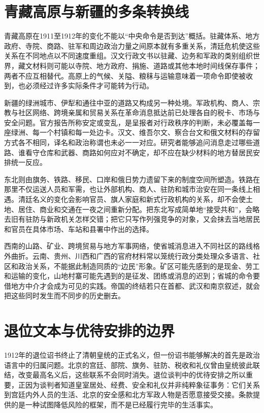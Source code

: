 \section{青藏高原与新疆的多条转换线}

青藏高原在1911至1912年的变化不能以“中央命令是否到达”概括。驻藏体系、地方政府、寺院、商路、驻军和周边政治力量之间原本就有多重关系，清廷危机使这些关系在不同地点以不同速度重组。汉文行政文书以驻藏、边务和军政的类别组织世界，藏文材料则可能以寺院、地方政府、捐施、道路或其他本地时间线保存事件；两者不应互相替代。高原上的气候、关隘、粮秣与运输意味着一项命令即使被收到，也必须经过许多实际条件才可能转为行动。

新疆的绿洲城市、伊犁和通往中亚的道路又构成另一种处境。军政机构、商人、宗教与社区网络、跨境亲属和贸易关系在革命消息抵达前已处理各自的税卡、市场与安全问题。官方报告所称安定或变乱，是呈报者对行政秩序的判断，未必覆盖每一座绿洲、每一个村镇和每一处边卡。汉文、维吾尔文、察合台文和俄文材料的存留方式各不相同，译名和政治称谓也未必一一对应。研究者能够追问消息走过哪些道路、谁看守仓库和武器、商路如何应对不确定，却不应在缺少材料的地方替居民安排统一反应。

东北则由旗务、铁路、移民、口岸和俄日势力遗留下来的制度空间所塑造。铁路在那里不仅运送人员和军需，也让外部机构、商人、驻防和城市治安在同一条线上相遇。清廷名义的变化会影响官员、旗人家庭和新式行政机构的关系，却不会使土地、居住、商业和交通在一夜之间重新分配。把东北写成简单地“接受共和”，会略去旧有驻防与新政机关怎样交错；把它只写作列强竞争的对象，又会抹去当地居民和官员在具体市场、车站和县署中作出的选择。

西南的山路、矿业、跨境贸易与地方军事网络，使省城消息进入不同社区的路线格外曲折。云南、贵州、川西和广西的官府材料常以笼统行政分类处理众多语言、社区和政治关系，不能据此制造同质的“边民”形象。矿区可能先感到的是现金、劳工和运输的变化，山地村寨可能先遇到的是征发、团练或消息的迟到；省城的命令要借地方中介才会成为可见的实践。帝国的终结若只在首都、武汉和南京叙述，就会把这些同时发生而不同步的历史删去。

\section{退位文本与优待安排的边界}

1912年的退位诏书终止了清朝皇统的正式名义，但一份诏书能够解决的首先是政治语言中的归属问题。北京的宫廷、部院、旗务、驻防、税收和礼仪曾由皇统彼此联结，改变最高名义后，这些联系不会同时消失。退位谈判中的优待安排之所以重要，正因为谈判者知道皇室居处、经费、安全和礼仪并非纯粹象征事务：它们关系到宫廷内外人员的生活、北京的安全感和北方军政人物是否愿意接受交接。条款提供的是一种试图降低风险的框架，而不是已经履行完毕的生活事实。

